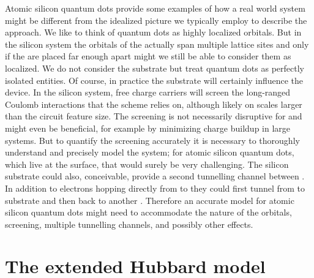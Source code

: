Atomic silicon quantum dots provide some examples of how a real world system
might be different from the idealized picture we typically employ to describe
the  approach. We like to think of quantum dots as highly localized
orbitals. But in the silicon system the orbitals of the  actually
span multiple lattice sites and only if the  are placed far enough
apart might we still be able to consider them as localized. We do not consider
the substrate but treat quantum dots as perfectly isolated entities. Of course,
in practice the substrate will certainly influence the  device. In the
silicon system, free charge carriers will screen the long-ranged Coulomb
interactions that the  scheme relies on, although likely on scales
larger than the circuit feature size. The screening is not necessarily
disruptive for  and might even be beneficial, for example by
minimizing charge buildup in large systems. But to quantify the screening
accurately it is necessary to thoroughly understand and precisely model the
system; for atomic silicon quantum dots, which live at the surface, that would
surely be very challenging. The silicon substrate could also, conceivable,
provide a second tunnelling channel between . In addition to
electrons hopping directly from  to  they could first tunnel
from  to substrate and then back to another . Therefore an
accurate model for atomic silicon quantum dots might need to accommodate the
nature of the  orbitals, screening, multiple tunnelling channels, and
possibly other effects.


\section{The extended Hubbard model}

